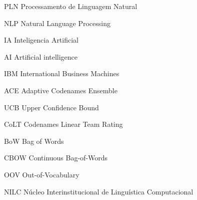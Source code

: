\begin{siglas}
 \item PLN Processamento de Linguagem Natural
 \item NLP Natural Language Processing
 \item IA Inteligencia Artificial
 \item AI Artificial intelligence
 \item IBM International Business Machines
 \item ACE Adaptive Codenames Ensemble
 \item UCB Upper Confidence Bound
 \item CoLT Codenames Linear Team Rating
 \item BoW Bag of Words
 \item CBOW Continuous Bag-of-Words
 \item OOV Out-of-Vocabulary
 \item NILC Núcleo Interinstitucional de Linguística Computacional 
\end{siglas}





